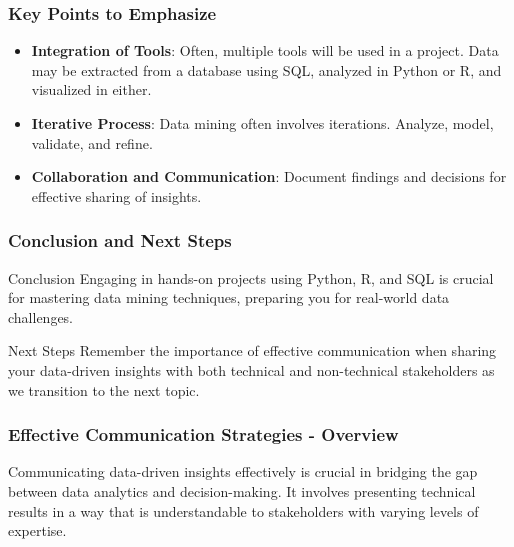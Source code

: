 \documentclass{beamer}
\begin{document}
\begin{frame}[fragile]
    \frametitle{Key Points to Emphasize}
    \begin{itemize}
        \item \textbf{Integration of Tools}: Often, multiple tools will be used in a project. Data may be extracted from a database using SQL, analyzed in Python or R, and visualized in either.
        \item \textbf{Iterative Process}: Data mining often involves iterations. Analyze, model, validate, and refine.
        \item \textbf{Collaboration and Communication}: Document findings and decisions for effective sharing of insights.
    \end{itemize}
\end{frame}

\begin{frame}[fragile]
    \frametitle{Conclusion and Next Steps}
    \begin{block}{Conclusion}
        Engaging in hands-on projects using Python, R, and SQL is crucial for mastering data mining techniques, preparing you for real-world data challenges.
    \end{block}
    \begin{block}{Next Steps}
        Remember the importance of effective communication when sharing your data-driven insights with both technical and non-technical stakeholders as we transition to the next topic.
    \end{block}
\end{frame}

\begin{frame}[fragile]
    \frametitle{Effective Communication Strategies - Overview}
    Communicating data-driven insights effectively is crucial in bridging the gap between data analytics and decision-making. It involves presenting technical results in a way that is understandable to stakeholders with varying levels of expertise.
\end{frame}
\end{document}
